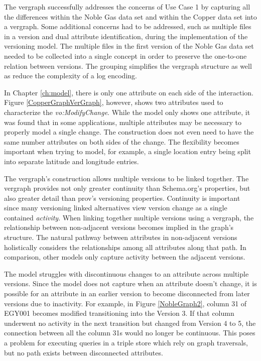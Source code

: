 The \gls{vergraph} successfully addresses the concerns of Use Case 1 by capturing all the differences within the Noble Gas data set and within the Copper data set into a \gls{vergraph}.
Some additional concerns had to be addressed, such as multiple files in a \gls{version} and dual \gls{attribute} identification, during the implementation of the versioning model.
The multiple files in the first version of the Noble Gas data set needed to be collected into a single concept in order to preserve the one-to-one relation between \glspl{version}.
The grouping simplifies the \gls{vergraph} structure as well as reduce the complexity of a \gls{log} encoding.

In Chapter \ref{ch:model}, there is only one \gls{attribute} on each side of the interaction.
Figure \ref{CopperGraphVerGraph}, however, shows two \glspl{attribute} used to characterize the \textit{vo:ModifyChange}.
While the model only shows one \gls{attribute}, it was found that in some applications, multiple \glspl{attribute} may be necessary to properly model a single \gls{change}.
The construction does not even need to have the same number \glspl{attribute} on both sides of the \gls{change}.
The flexibility becomes important when trying to model, for example, a single location entry being split into separate latitude and longitude entries.

The \gls{vergraph}'s construction allows multiple \glspl{version} to be linked together.
The \gls{vergraph} provides not only greater continuity than Schema.org's properties, but also greater detail than \gls{prov}'s versioning properties.
Continuity is important since many versioning \gls{linked} alternatives view version change as a single contained \textit{activity}.
When linking together multiple \glspl{version} using a \gls{vergraph}, the relationship between non-adjacent \glspl{version} becomes implied in the graph's structure.
The natural pathway between \glspl{attribute} in non-adjacent \glspl{version} holistically considers the relationships among all \glspl{attribute} along that path.
In comparison, other models only capture activity between the adjacent \glspl{version}.

The model struggles with discontinuous changes to an \gls{attribute} across multiple \glspl{version}.
Since the model does not capture when an \gls{attribute} doesn't change, it is possible for an \gls{attribute} in an earlier \gls{version} to become disconnected from later \glspl{version} due to inactivity.
For example, in Figure \ref{NobleGraph2}, column 31 of EGY001 becomes modified transitioning into the Version 3.
If that column underwent no activity in the next transition but changed from Version 4 to 5, the connection between all the column 31s would no longer be continuous.
This poses a problem for executing queries in a triple store which rely on graph traversals, but no path exists between disconnected \glspl{attribute}.


